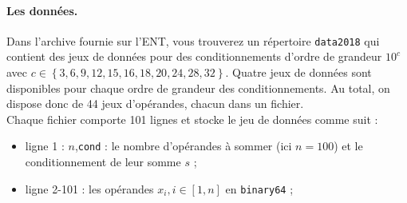 \documentclass{exam}
\begin{document}
    \paragraph{\large Les données.}
    \justifying
    Dans l'archive fournie sur l'ENT, vous trouverez un répertoire \verb=data2018= qui contient des jeux de données pour des conditionnements d'ordre de grandeur $10^{c}$ avec ${c\in\left\lbrace 3,6,9,12,15,16,18,20,24,28,32\right\rbrace}$.
    Quatre jeux de données sont disponibles pour chaque ordre de grandeur des conditionnements. Au total, on dispose donc de 44 jeux d'opérandes, chacun dans un fichier.
   \\
    Chaque fichier comporte 101 lignes et stocke le jeu de données comme suit :
    \begin{itemize}
        \item ligne 1 : $n$,\verb=cond= : le nombre d'opérandes à sommer (ici $n=100$) et le conditionnement de leur somme $s$ ;
        \item ligne 2-101 : les opérandes $x_{i},i\in\left[1,n\right]$ en \verb=binary64= ;
    \end{itemize}
\end{document}
